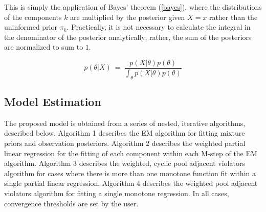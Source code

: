 \documentclass[fleqn,10pt]{olplainarticle}\usepackage[]{graphicx}\usepackage[]{color}
\begin{document}
This is simply the application of Bayes' theorem (\ref{bayes}), where the distributions of the components $k$ are multiplied by the posterior given $X = x$ rather than the uninformed prior $\pi_k$. Practically, it is not necessary to calculate the integral in the denominator of the posterior analytically; rather, the sum of the posteriors are normalized to sum to $1$.

\begin{equation} \label{bayes}
  p(\theta | X) \ =\ \frac{p(X|\theta)p(\theta)}{\int_{\theta}p(X|\theta)p(\theta)}
\end{equation}



\subsection{Model Estimation}

The proposed model is obtained from a series of nested, iterative algorithms, described below. Algorithm 1 describes the EM algorithm for fitting mixture priors and observation posteriors. Algorithm 2 describes the weighted partial linear regression for the fitting of each component within each M-step of the EM algorithm. Algorithm 3 describes the weighted, cyclic pool adjacent violators algorithm for cases where there is more than one monotone function fit within a single partial linear regression. Algorithm 4 describes the weighted pool adjacent violators algorithm for fitting a single monotone regression. In all cases, convergence thresholds are set by the user.
\end{document}
